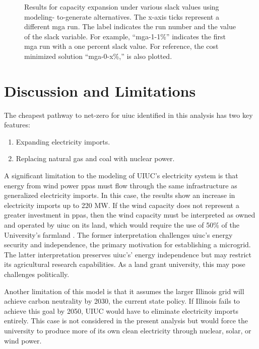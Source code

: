 \begin{figure}[H]
  \centering
  \resizebox{0.95\columnwidth}{!}{}
  \caption{Results for capacity expansion under various slack values using modeling-
  to-generate alternatives. The x-axis ticks represent a different \gls{mga} run.
  The label indicates the run number and the value of the slack variable. For example,
  ``mga-1-1\%'' indicates the first \gls{mga} run with a one percent
  slack value. For reference, the cost minimized solution ``mga-0-x\%,'' is also
  plotted.}
  \label{fig:uiuc_chw_mga}
\end{figure}

\section{Discussion and Limitations}
The cheapest pathway to net-zero for \gls{uiuc} identified in this analysis has two key features:
\begin{enumerate}
\item Expanding electricity imports.
\item Replacing natural gas and coal with nuclear power.
\end{enumerate}
A significant limitation to the modeling of UIUC’s electricity system is that energy
from wind power \glspl{ppa} must flow through the same infrastructure as generalized
electricity imports. In this case, the results show an increase in electricity
imports up to 220 MW. If the wind capacity does not represent a greater investment
in \glspl{ppa}, then the wind capacity must be interpreted as owned and operated
by \gls{uiuc} on its land, which would require the use of 50\% of the University's
farmland \cite{lopez_us_2012}. The former interpretation challenges \gls{uiuc}'s
energy security and independence, the primary motivation for establishing a microgrid.
The latter interpretation preserves \gls{uiuc}'s' energy independence but may restrict
its agricultural research capabilities. As a land grant university, this may
pose challenges politically.

Another limitation of this model is that it assumes the larger Illinois grid will
achieve carbon neutrality by 2030, the current state policy. If Illinois fails to
achieve this goal by 2050, UIUC would have to eliminate electricity imports entirely.
This case is not considered in the present analysis but would force the university
to produce more of its own clean electricity through nuclear, solar, or wind power.

